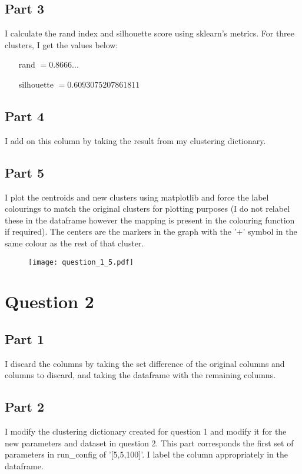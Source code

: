 \documentclass{scrreprt}
\begin{document}
\section{Part 3}\label{E1Q3}
I calculate the rand index and silhouette score using sklearn's metrics. For three clusters, I get the values below:
\begin{itemize}
	\item[rand] $= 0.8666...$
	\item[silhouette] $= 0.6093075207861811$
\end{itemize}

\section{Part 4}\label{E1Q4}
I add on this column by taking the result from my clustering dictionary.

\section{Part 5}\label{E1Q5}
I plot the centroids and new clusters using matplotlib and force the label colourings to match the original clusters for plotting purposes (I do not relabel these in the dataframe however the mapping is present in the colouring function if required). The centers are the markers in the graph with the '+' symbol in the same colour as the rest of that cluster.
\begin{figure}[h!]
	\centering
	\texttt{[image: question\_1\_5.pdf]}
\end{figure}

\newpage
\chapter{Question 2}

\section{Part 1}\label{E2Q1}
I discard the columns by taking the set difference of the original columns and columns to discard, and taking the dataframe with the remaining columns.

\section{Part 2}\label{E2Q2}
I modify the clustering dictionary created for question 1 and modify it for the new parameters and dataset in question 2. This part corresponds  the first set of parameters in run\_config of '[5,5,100]'. I label the column appropriately in the dataframe.
\end{document}
